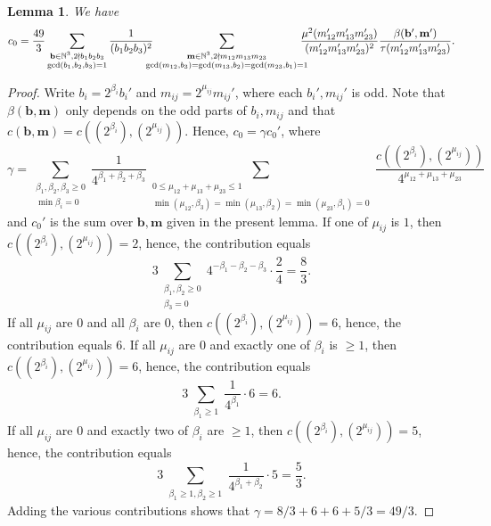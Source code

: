 \documentclass[a4paper,12pt,reqno]{amsart}
\numberwithin{equation}{section} \numberwithin{figure}{section}
\newcommand\N{\mathbb{N}}
\renewcommand{\b}{\mathbf}
\renewcommand{\gcd}{\textrm{gcd}}
\renewcommand{\leq}{\leqslant}
\renewcommand{\geq}{\geqslant}
\renewcommand{\#}{\sharp}
\newtheorem{lemma}{Lemma}
\theoremstyle{definition}
\numberwithin{lemma}{section}
\begin{document}
 \begin{lemma} 
\label{lem:hofactorout2o}
We have 
$$
c_0=\frac{49}{3}
 \sum_{\substack{\b b \in  \N ^3, 2\nmid  b_1 b_2 b_3\\  \gcd(b_1,b_2,b_3)=1   }}
 \frac{1}{ (b_1b_2b_3)^2    } \hspace{-0,3cm}
  \sum_{\substack{\b m\in \N^3, 2\nmid m_{12} m_{13} m_{23} \\  
 \gcd(m_{12},b_3  )= \gcd(m_{13},b_2 )= \gcd(m_{23},b_1  )=1
   }} 
 \hspace{-0,3cm}
 \frac{ \mu^2(m_{12} 'm_{13}' m_{23}')}{  (m_{12}' m_{13}' m_{23}')^2  }
 \frac{     \beta(\b b' , \b m' )   }{    \tau(  m_{12}'    m_{13}' m_{23}' )   }
.$$
\end{lemma}
\begin{proof}
Write  $ b_i=2^{\beta_i} b_i'$ and $m_{ij}=2^{\mu_{ij} } m_{ij}'$, where each $b_i',  m_{ij}'$ is   odd. 
Note that $ \beta(\b b , \b m ) $ only depends on the odd parts of   $b_i,m_{ij}$
and that $ c(\b b , \b m )= c( (2^{\beta_i }) , (2^{ \mu_{ij} } ) )$.
Hence, $c_0=\gamma c_0'$, where  
\[\gamma=
 \sum_{\substack{\beta_1,\beta_2,\beta_3 \geq 0  \\  \min \beta_i=0   }}
 \frac{1}{ 4^{\beta_1+ \beta_2 + \beta_3 }   }
 \sum_{\substack{
0\leq 
 \mu_{12}+  \mu_{13} + \mu_{23}\leq 1 
\\
 \min(\mu_{12},\beta_3  )= \min(\mu_{13},\beta_2   )= \min(\mu_{23},\beta_1   )=0
   }}  
 \frac{    c( (2^{\beta_i }) , (2^{ \mu_{ij} } ) )   }{ 4^{\mu_{12} +\mu_{13} +\mu_{23} }   }
 \] and $c_0'$ is the sum over $\b b, \b m $ given in the present lemma. 
If one of  $ \mu_{ij}$ is  $1$, then $ c( (2^{\beta_i }) , (2^{ \mu_{ij} } ) )=2 $, hence, the contribution equals 
\[ 3
 \sum_{\substack{\beta_1,\beta_2  \geq 0  \\  \beta_3=0   }}
 4^{-\beta_1- \beta_2 - \beta_3 }   
\cdot   \frac{2}{4}   = \frac{8  }{  3 }.  \] 
If all    $ \mu_{ij}$ are  $0$ and all $\beta_i$ are $0$, then $ c( (2^{\beta_i }) , (2^{ \mu_{ij} } ) )=6 $, hence, the contribution equals  $6$.
If all    $ \mu_{ij}$ are  $0$ and exactly one of  $  \beta_i   $ is  $\geq 1 $, 
then $ c( (2^{\beta_i }) , (2^{ \mu_{ij} } ) )=6 $, hence, the contribution equals  
\[  3  \sum_{\substack{\beta_1  \geq 1    }}  \frac{1}{ 4^{\beta_1  }   }\cdot  6= 6 . \] 
If all    $ \mu_{ij}$ are  $0$ and exactly two  of  $  \beta_i   $  are  $\geq 1 $, 
then $ c( (2^{\beta_i }) , (2^{ \mu_{ij} } ) )=5 $, hence, the contribution equals  
\[3   \sum_{\substack{\beta_1\geq 1 , \beta_2\geq 1   }} \frac{1}{ 4^{\beta_1+ \beta_2   }   } \cdot  5=\frac{5}{3} .  \] 
Adding the various contributions shows that 
$\gamma=8/3+6+6+5/3=49/3$. 
\end{proof}
\end{document}
